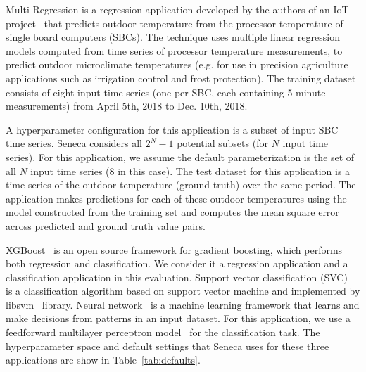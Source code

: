 Multi-Regression is a regression application 
developed by the authors of 
an IoT project~\cite{iot-cpu} that
predicts outdoor temperature from the processor 
temperature of single board computers (SBCs).  
The technique uses multiple linear regression models computed from time
series of processor temperature measurements,
to predict outdoor microclimate temperatures (e.g. for use in 
precision agriculture applications such as irrigation control and frost protection).
The training dataset consists of eight input time series (one per SBC, each containing 
5-minute measurements) from April 5th, 2018 to Dec. 10th, 2018.

A hyperparameter configuration for this application is a subset of input SBC time series.
Seneca considers all \texttt{$2^N - 1$} potential subsets (for $N$ input time series).
For this application,
we assume the default parameterization is the set of all $N$ input time series (8 in this case).
The test dataset for this application is a time series of the outdoor temperature (ground truth) 
over the same period.  The application makes predictions for each of these outdoor temperatures
using the model constructed from the training set
and computes the mean square error across predicted and ground truth value pairs.

XGBoost~\cite{ref:xgboost-web} is an open source framework for gradient boosting, which 
performs both regression and classification. We consider it a regression application and
a classification application in this evaluation.  
Support vector classification (SVC)~\cite{ref:svc} is a classification algorithm 
based on support vector machine and implemented by libsvm~\cite{ref:libsvm} library.
Neural network~\cite{ref:neural_network} is a machine learning framework that learns 
and make decisions from patterns in an input dataset. For this application, 
we use a feedforward multilayer perceptron model~\cite{ref:feedforward_nn} 
for the classification task. The hyperparameter space and default settings that Seneca uses for these three applications are show in Table~\ref{tab:defaults}.

